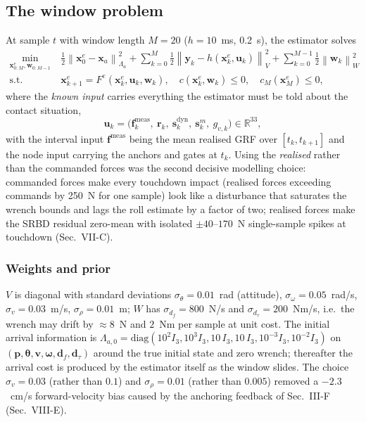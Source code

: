\documentclass[11pt]{article}
\newcommand{\R}{\mathbb{R}}
\newcommand{\bx}{\bm{x}}\newcommand{\bu}{\bm{u}}\newcommand{\bw}{\bm{w}}\newcommand{\by}{\bm{y}}
\newcommand{\bp}{\bm{p}}\newcommand{\bv}{\bm{v}}\newcommand{\bom}{\bm{\omega}}\newcommand{\bth}{\bm{\theta}}
\newcommand{\bfv}{\bm{f}}\newcommand{\br}{\bm{r}}\newcommand{\bd}{\bm{d}}\newcommand{\bs}{\bm{s}}
\newcommand{\norm}[1]{\left\|#1\right\|}
\newcommand{\ie}{i.e.}\newcommand{\eg}{e.g.}
\begin{document}
\subsection{The window problem}
At sample $t$ with window length $M=20$ ($h=10$~ms, 0.2~s), the estimator solves
\begin{subequations}\label{eq:mhe}
\begin{align}
\min_{\bx^e_{0:M},\bw_{0:M-1}}\ &\tfrac12\norm{\bx^e_0-\bx_a}^2_{\Lambda_a}+\sum_{k=0}^{M}\tfrac12\norm{\by_k-h(\bx^e_k,\bu_k)}^2_V+\sum_{k=0}^{M-1}\tfrac12\norm{\bw_k}^2_W\\
\text{s.t.}\ &\bx^e_{k+1}=F^e(\bx^e_k,\bu_k,\bw_k),\quad c(\bx^e_k,\bw_k)\le0,\quad c_M(\bx^e_M)\le0,
\end{align}
\end{subequations}
where the \emph{known input} carries everything the estimator must be told about the contact situation,
\begin{equation}
\bu_k=\big(\bfv^{\mathrm{meas}}_k,\ \br_k,\ \bs^{\mathrm{dyn}}_k,\ \bs^m_k,\ g_{v,k}\big)\in\R^{33},
\label{eq:uk}
\end{equation}
with the interval input $\bfv^{\mathrm{meas}}$ being the mean realised GRF over $[t_{k},t_{k+1}]$ and the node input carrying the anchors and gates at $t_k$. Using the \emph{realised} rather than the commanded forces was the second decisive modelling choice: commanded forces make every touchdown impact (realised forces exceeding commands by 250~N for one sample) look like a disturbance that saturates the wrench bounds and lags the roll estimate by a factor of two; realised forces make the SRBD residual zero-mean with isolated $\pm40$--$170$~N single-sample spikes at touchdown (Sec.~VII-C).

\subsubsection{Weights and prior}
$V$ is diagonal with standard deviations $\sigma_\theta=0.01$~rad (attitude), $\sigma_\omega=0.05$~rad/s, $\sigma_v=0.03$~m/s, $\sigma_\rho=0.01$~m; $W$ has $\sigma_{\dot d_f}=800$~N/s and $\sigma_{\dot d_\tau}=200$~Nm/s, \ie\ the wrench may drift by $\approx8$~N and $2$~Nm per sample at unit cost. The initial arrival information is $\Lambda_{a,0}=\mathrm{diag}(10^2 I_3,10^3 I_3,10\,I_3,10\,I_3,10^{-3}I_3,10^{-2}I_3)$ on $(\bp,\bth,\bv,\bom,\bd_f,\bd_\tau)$ around the true initial state and zero wrench; thereafter the arrival cost is produced by the estimator itself as the window slides. The choice $\sigma_v=0.03$ (rather than $0.1$) and $\sigma_\rho=0.01$ (rather than $0.005$) removed a $-2.3$~cm/s forward-velocity bias caused by the anchoring feedback of Sec.~III-F (Sec.~VIII-E).
\end{document}
